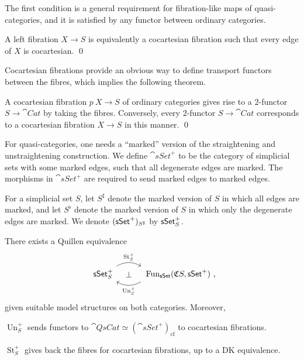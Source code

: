 The first condition is a general requirement for fibration-like maps of quasi-categories,
and it is satisfied by any functor between ordinary categories.

\begin{proposition}
    A left fibration $X\to S$ is equivalently a cocartesian fibration
    such that every edge of $X$ is cocartesian. \qed
\end{proposition}

Cocartesian fibrations provide an obvious way to 
define transport functors between the fibres,
which implies the following theorem.

\begin{theorem}
    A cocartesian fibration $p\:X\to S$ of ordinary categories
    gives rise to a $2$-functor $S\to\cat{Cat}$ by taking the fibres.
    Conversely, every $2$-functor $S\to\cat{Cat}$
    corresponds to a cocartesian fibration $X\to S$ in this manner. \qed
\end{theorem}

For quasi-categories, one needs a ``marked'' version
of the straightening and unstraightening construction.
We define $\cat{sSet}^+$ to be the category of simplicial sets 
with some marked edges, such that all degenerate edges are marked.
The morphisms in $\cat{sSet}^+$ are required to send marked edges to marked edges.

For a simplicial set $S$, let $S^\sharp$ denote 
the marked version of $S$ in which all edges are marked,
and let $S^\flat$ denote the marked version of $S$
in which only the degenerate edges are marked.
We denote $(\mathsf{sSet}^+)_{\/{S^\sharp}}$ by $\mathsf{sSet}^+_{\/S}$.

\begin{theorem}
    There exists a Quillen equivalence
    \[\begin{tikzcd}[column sep=3em]
        \cat{sSet}^+_{\/S}\ar[r,bend left,start anchor=north east,end anchor=north west,"\operatorname{St}_S^+"]
        \ar[r,phantom,"\bot"] &
        \vphantom{\cat{sSet}^+_{\/S}}
        \operatorname{Fun}_{\cat{sSet}}(\mathfrak CS,\cat{sSet}^+)\rlap{\ ,}
        \ar[l,bend left,start anchor=south west,end anchor=south east,"\operatorname{Un}_S^+"]
    \end{tikzcd}\]
    given suitable model structures on both categories.
    Moreover, 
    \begin{itms}
        \item $\operatorname{Un}_S^+$ sends functors to
        $\cat{QsCat}\simeq(\cat{sSet}^+)_{\mathrm{cf}}$
        to cocartesian fibrations.
        \item $\operatorname{St}_S^+$ gives back the fibres
        for cocartesian fibrations,
        up to a DK equivalence.
    \end{itms}
\end{theorem}

